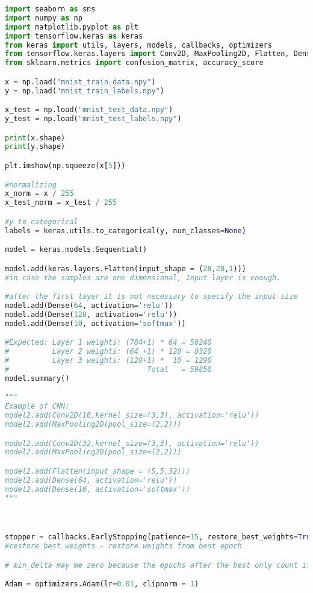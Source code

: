 \begin{lstlisting}[language = python]
import seaborn as sns
import numpy as np
import matplotlib.pyplot as plt
import tensorflow.keras as keras 
from keras import utils, layers, models, callbacks, optimizers
from tensorflow.keras.layers import Conv2D, MaxPooling2D, Flatten, Dense
from sklearn.metrics import confusion_matrix, accuracy_score

x = np.load("mnist_train_data.npy")
y = np.load("mnist_train_labels.npy")

x_test = np.load("mnist_test_data.npy")
y_test = np.load("mnist_test_labels.npy")

print(x.shape)
print(y.shape)

plt.imshow(np.squeeze(x[5]))

#normalizing
x_norm = x / 255
x_test_norm = x_test / 255

#y to categorical
labels = keras.utils.to_categorical(y, num_classes=None)

model = keras.models.Sequential()

model.add(keras.layers.Flatten(input_shape = (28,28,1)))
#in case the samples are one dimensional, Input layer is enough.

#after the first layer it is not necessary to specify the input size
model.add(Dense(64, activation='relu'))
model.add(Dense(128, activation='relu'))
model.add(Dense(10, activation='softmax'))

#Expected: Layer 1 weights: (784+1) * 64 = 50240
#          Layer 2 weights: (64 +1) * 128 = 8320
#          Layer 3 weights: (128+1) *  10 = 1290
#                                Total   = 59850
model.summary()

"""
Example of CNN:
model2.add(Conv2D(16,kernel_size=(3,3), activation='relu'))
model2.add(MaxPooling2D(pool_size=(2,2)))

model2.add(Conv2D(32,kernel_size=(3,3), activation='relu'))
model2.add(MaxPooling2D(pool_size=(2,2)))

model2.add(Flatten(input_shape = (5,5,32)))
model2.add(Dense(64, activation='relu'))
model2.add(Dense(10, activation='softmax'))
"""



stopper = callbacks.EarlyStopping(patience=15, restore_best_weights=True)
#restore_best_weights - restore weights from best epoch 

# min_delta may me zero because the epochs after the best only count if there's improvement

Adam = optimizers.Adam(lr=0.01, clipnorm = 1)


\end{lstlisting}

